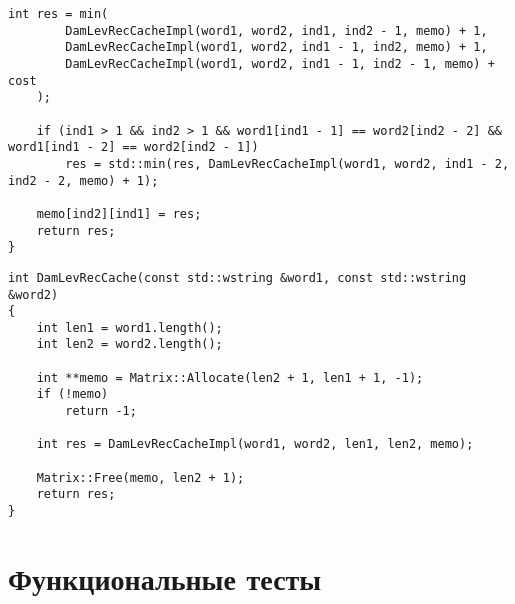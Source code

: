 \begin{lstlisting}[caption=Рекурсивный алгоритм поиска расстояния Дамерау\,--\,Левенштейна с кэшированием (реализация) (часть 2)]
    int res = min(
        DamLevRecCacheImpl(word1, word2, ind1, ind2 - 1, memo) + 1,
        DamLevRecCacheImpl(word1, word2, ind1 - 1, ind2, memo) + 1,
        DamLevRecCacheImpl(word1, word2, ind1 - 1, ind2 - 1, memo) + cost
    );

    if (ind1 > 1 && ind2 > 1 && word1[ind1 - 1] == word2[ind2 - 2] && word1[ind1 - 2] == word2[ind2 - 1])
        res = std::min(res, DamLevRecCacheImpl(word1, word2, ind1 - 2, ind2 - 2, memo) + 1);

    memo[ind2][ind1] = res;
    return res;
}
\end{lstlisting}

\begin{lstlisting}[caption=Рекурсивный алгоритм поиска расстояния Дамерау\,--\,Левенштейна с кэшированием (оберточная функция)]
int DamLevRecCache(const std::wstring &word1, const std::wstring &word2)
{
    int len1 = word1.length();
    int len2 = word2.length();

    int **memo = Matrix::Allocate(len2 + 1, len1 + 1, -1);
    if (!memo)
        return -1;

    int res = DamLevRecCacheImpl(word1, word2, len1, len2, memo);

    Matrix::Free(memo, len2 + 1);
    return res;
}
\end{lstlisting}

\section{Функциональные тесты}


